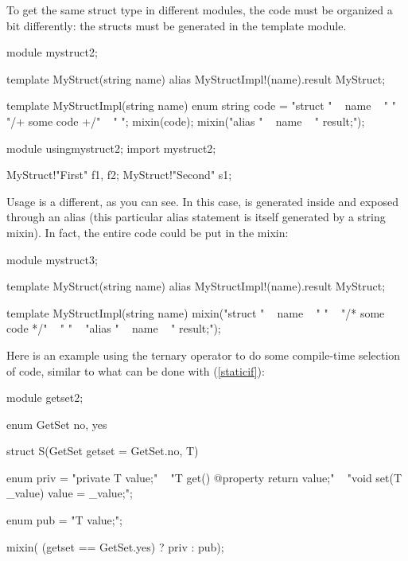 To get the same struct type in different modules, the code must be organized a bit differently: the structs must be generated in the template module.

\begin{dcode}
module mystruct2;

template MyStruct(string name)
{
    alias MyStructImpl!(name).result MyStruct;
}

template MyStructImpl(string name)
{    
    enum string code = "struct " ~ name 
                     ~ " { "
                     ~ "/+ some code +/"
                     ~ " }";
    mixin(code);
    mixin("alias " ~ name ~ " result;");
}
\end{dcode}

\begin{dcode}
module usingmystruct2;
import mystruct2;

MyStruct!"First" f1, f2;
MyStruct!"Second" s1;
\end{dcode}

Usage is a different, as you can see. In this case,  is generated inside  and exposed through an alias (this particular alias statement is itself generated by a string mixin). In fact, the entire code could be put in the mixin:

\begin{dcode}
module mystruct3;

template MyStruct(string name)
{
    alias MyStructImpl!(name).result MyStruct;
}

template MyStructImpl(string name)
{
mixin("struct " ~ name 
    ~ " {"
    ~ "/* some code */"
    ~ " }\n"
    ~ "alias " ~ name ~ " result;");
}
\end{dcode}

Here is an example using the ternary  operator to do some compile-time selection of code, similar to what can be done with  (\ref{staticif}):

\begin{dcode}
module getset2;

enum GetSet { no, yes}

struct S(GetSet getset = GetSet.no, T)
{
    enum priv = "private T value;\n"
              ~ "T get() @property { return value;}\n"
              ~ "void set(T _value) { value = _value;}";

    enum pub = "T value;";

    mixin( (getset == GetSet.yes) ? priv : pub);
}
\end{dcode}

